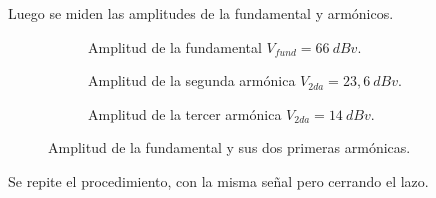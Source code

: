       Luego se miden las amplitudes de la fundamental y armónicos.

    \begin{figure}[H]
        \centering
        \begin{subfigure}[H]{0.48\textwidth}
          \caption{Amplitud de la fundamental $V_{fund}=66~dBv$.}
          \label{fig:Exp7AmpFundamentalLA}
        \end{subfigure}
        \hfill 
        \begin{subfigure}[H]{0.48\textwidth}
          \caption{Amplitud de la segunda armónica $V_{2da}=23,6~dBv$.}
          \label{fig:Exp7AmpSegundaLA}
        \end{subfigure}     
        \begin{subfigure}[H]{0.48\textwidth}
          \caption{Amplitud de la tercer armónica $V_{2da}=14~dBv$.}
          \label{fig:Exp7AmpTercerLA}
        \end{subfigure}   
        \caption{Amplitud de la fundamental y sus dos primeras armónicas.}
        \label{fig:Exp7AmplFundYArmonicasLA}
      \end{figure}

      Se repite el procedimiento, con la misma señal pero cerrando el lazo.

